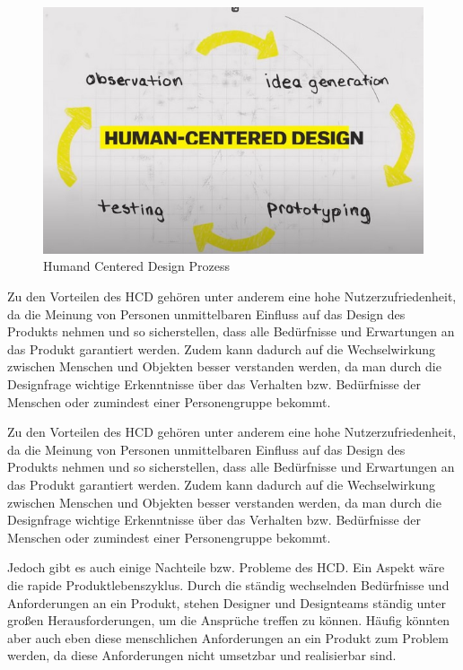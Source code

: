 \begin{figure}[h]
    \centering
    \includegraphics[width=1\textwidth]{images/03/HCD.jpg}
    \caption{Humand Centered Design Prozess}
\end{figure}

Zu den Vorteilen des \acs{HCD} gehören unter anderem eine hohe Nutzerzufriedenheit, da die Meinung von Personen unmittelbaren Einfluss auf das Design des Produkts nehmen und so sicherstellen, dass alle Bedürfnisse und Erwartungen an das Produkt garantiert werden. Zudem kann dadurch auf die Wechselwirkung zwischen Menschen und Objekten besser verstanden werden, da man durch die Designfrage wichtige Erkenntnisse über das Verhalten bzw. Bedürfnisse der Menschen oder zumindest einer Personengruppe bekommt.

Zu den Vorteilen des \acs{HCD} gehören unter anderem eine hohe Nutzerzufriedenheit, da die Meinung von Personen unmittelbaren Einfluss auf das Design des Produkts nehmen und so sicherstellen, dass alle Bedürfnisse und Erwartungen an das Produkt garantiert werden.\cite{hcd:2021} Zudem kann dadurch auf die Wechselwirkung zwischen Menschen und Objekten besser verstanden werden, da man durch die Designfrage wichtige Erkenntnisse über das Verhalten bzw. Bedürfnisse der Menschen oder zumindest einer Personengruppe bekommt.\cite{let:2022}

Jedoch gibt es auch einige Nachteile bzw. Probleme des \acs{HCD}. Ein Aspekt wäre die rapide Produktlebenszyklus. Durch die ständig wechselnden Bedürfnisse und Anforderungen an ein Produkt, stehen Designer und Designteams ständig unter großen Herausforderungen, um die Ansprüche treffen zu können. Häufig könnten aber auch eben diese menschlichen Anforderungen an ein Produkt zum Problem werden, da diese Anforderungen nicht umsetzbar und realisierbar sind.\cite{pod:2016}

